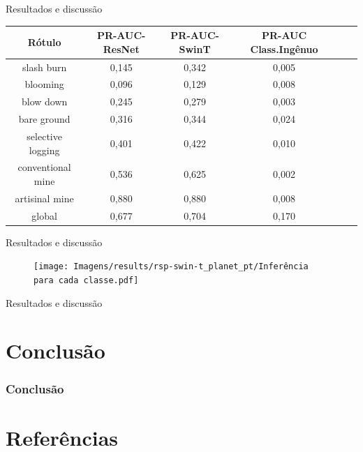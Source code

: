 \documentclass{beamer}
\begin{document}
\begin{frame}{Resultados e discussão}
    \begin{tabular}{*{6}{c}}
        \hline
        Rótulo &PR-AUC-ResNet&PR-AUC-SwinT&PR-AUC Class.Ingênuo \\
        \hline
                slash burn &       0,145 &      0,342 &     0,005 \\
                  blooming &       0,096 &      0,129 &     0,008 \\
                 blow down &       0,245 &      0,279 &     0,003 \\
               bare ground &       0,316 &      0,344 &     0,024 \\
         selective logging &       0,401 &      0,422 &     0,010 \\
         conventional mine &       0,536 &      0,625 &     0,002 \\
            artisinal mine &       0,880 &      0,880 &     0,008 \\
                    global &       0,677 &      0,704 &     0,170 \\
        \hline
    \end{tabular}    
\end{frame}    


\begin{frame}{Resultados e discussão}
    \begin{figure}[!ht]
        \centering
        \texttt{[image: Imagens/results/rsp-swin-t\_planet\_pt/Inferência para cada classe.pdf]}
        \label{fig:InferenciaClassesSwin}
    \end{figure}    
\end{frame}    


\begin{frame}{Resultados e discussão}
    
\end{frame}    


\section{Conclusão} 

\begin{frame}
\frametitle{Conclusão}



\end{frame}

\section{Referências} 
\fontsize{6pt}{7pt}\selectfont

\end{document}
